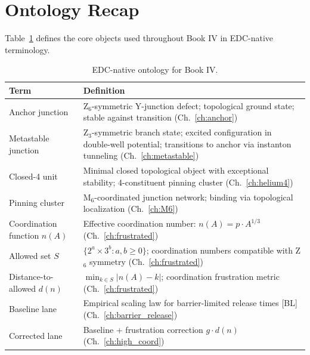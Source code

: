 \section{Ontology Recap}
\label{sec:unified:ontology}

Table~\ref{tab:unified:glossary} defines the core objects used throughout
Book IV in EDC-native terminology.

\begin{table}[h]
\centering
\caption{EDC-native ontology for Book IV.}
\label{tab:unified:glossary}
\begin{tabular}{lp{9cm}}
    \toprule
    Term & Definition \\
    \midrule
    Anchor junction &
    Z$_6$-symmetric Y-junction defect; topological ground state;
    stable against transition (Ch.~\ref{ch:anchor}) \\
    Metastable junction &
    Z$_3$-symmetric branch state; excited configuration in double-well
    potential; transitions to anchor via instanton tunneling (Ch.~\ref{ch:metastable}) \\
    Closed-4 unit &
    Minimal closed topological object with exceptional stability;
    4-constituent pinning cluster (Ch.~\ref{ch:helium4}) \\
    Pinning cluster &
    M$_6$-coordinated junction network; binding via topological
    localization (Ch.~\ref{ch:M6}) \\
    Coordination function $n(A)$ &
    Effective coordination number: $n(A) = p \cdot A^{1/3}$ (Ch.~\ref{ch:frustrated}) \\
    Allowed set $S$ &
    $\{2^a \times 3^b : a, b \geq 0\}$; coordination numbers compatible
    with Z$_6$ symmetry (Ch.~\ref{ch:frustrated}) \\
    Distance-to-allowed $d(n)$ &
    $\min_{k \in S}|n(A) - k|$; coordination frustration metric
    (Ch.~\ref{ch:frustrated}) \\
    Baseline lane &
    Empirical scaling law for barrier-limited release times [BL]
    (Ch.~\ref{ch:barrier_release}) \\
    Corrected lane &
    Baseline + frustration correction $g \cdot d(n)$
    (Ch.~\ref{ch:high_coord}) \\
    \bottomrule
\end{tabular}
\end{table}

